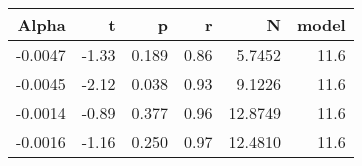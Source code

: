 \begin{table}[ht]
\centering
\begin{tabular}{rrrrrr}
  \hline
Alpha & t & p & r & N & model \\ 
  \hline
-0.0047 & -1.33 & 0.189 & 0.86 & 5.7452 & 11.6 \\ 
  -0.0045 & -2.12 & 0.038 & 0.93 & 9.1226 & 11.6 \\ 
  -0.0014 & -0.89 & 0.377 & 0.96 & 12.8749 & 11.6 \\ 
  -0.0016 & -1.16 & 0.250 & 0.97 & 12.4810 & 11.6 \\ 
   \hline
\end{tabular}
\end{table}

